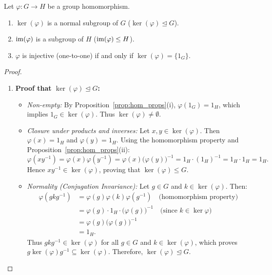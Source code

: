 \begin{proposition}
\label{prop:inj_ker}
Let $\varphi: G \to H$ be a group homomorphism.
\begin{enumerate}[label=\textbf{(\roman*)}, leftmargin=*, itemsep=4pt]
    \item $\ker(\varphi)$ is a normal subgroup of $G$ ($\ker(\varphi) \trianglelefteq G$).
    \item $\operatorname{im}(\varphi)$ is a subgroup of $H$ ($\operatorname{im}(\varphi) \le H$).
    \item $\varphi$ is injective (one-to-one) if and only if $\ker(\varphi) = \{ 1_G \}$.
\end{enumerate}
\end{proposition}

\begin{proof}
\begin{enumerate}[label=\textbf{(\roman*)}, leftmargin=*, itemsep=8pt]
    \item \textbf{Proof that $\ker(\varphi) \trianglelefteq G$:}
    \begin{itemize}[leftmargin=1.5em, itemsep=4pt]
        \item \emph{Non-empty:} By Proposition~\ref{prop:hom_props}(i), $\varphi(1_G) = 1_H$, which implies $1_G \in \ker(\varphi)$. Thus $\ker(\varphi) \ne \emptyset$.
        \item \emph{Closure under products and inverses:} Let $x, y \in \ker(\varphi)$. Then $\varphi(x) = 1_H$ and $\varphi(y) = 1_H$. Using the homomorphism property and Proposition~\ref{prop:hom_props}(ii):
        \begin{equation*}
        \varphi(xy^{-1}) = \varphi(x)\varphi(y^{-1}) = \varphi(x)\bigl(\varphi(y)\bigr)^{-1} = 1_H \cdot (1_H)^{-1} = 1_H \cdot 1_H = 1_H.
        \end{equation*}
        Hence $xy^{-1} \in \ker(\varphi)$, proving that $\ker(\varphi) \le G$.
        \item \emph{Normality (Conjugation Invariance):} Let $g \in G$ and $k \in \ker(\varphi)$. Then:
        \begin{align*}
        \varphi(gkg^{-1}) &= \varphi(g)\varphi(k)\varphi(g^{-1}) \quad \text{(homomorphism property)} \\
        &= \varphi(g) \cdot 1_H \cdot \bigl(\varphi(g)\bigr)^{-1} \quad \text{(since $k \in \ker\varphi$)} \\
        &= \varphi(g)\bigl(\varphi(g)\bigr)^{-1} \\
        &= 1_H.
        \end{align*}
        Thus $gkg^{-1} \in \ker(\varphi)$ for all $g \in G$ and $k \in \ker(\varphi)$, which proves $g \ker(\varphi) g^{-1} \subseteq \ker(\varphi)$. Therefore, $\ker(\varphi) \trianglelefteq G$.
    \end{itemize}


\end{enumerate}
\end{proof}
